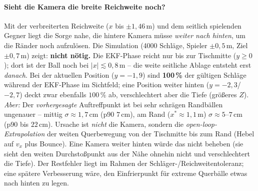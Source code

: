 \paragraph{Sieht die Kamera die breite Reichweite noch?} Mit der verbreiterten
Reichweite ($x$ bis $\pm1{,}46\,$m) und dem seitlich spielenden Gegner liegt die
Sorge nahe, die hintere Kamera müsse \emph{weiter nach hinten}, um die Ränder noch
aufzulösen. Die Simulation (4000 Schläge, Spieler $\pm0{,}5\,$m, Ziel $\pm0{,}7\,$m)
zeigt: \textbf{nicht nötig.} Die EKF-Phase reicht nur bis zur Tischmitte
($y\!\ge\!0$); dort ist der Ball noch bei $|x|\lesssim0{,}8\,$m -- die weite
seitliche Ablage entsteht erst \emph{danach}. Bei der aktuellen Position
($y=-1{,}9$) sind \textbf{100\,\%} der gültigen Schläge während der EKF-Phase im
Sichtfeld; eine Position weiter hinten ($y=-2{,}3$/$-2{,}7$) deckt zwar ebenfalls
$100\,\%$ ab, verschlechtert aber die Tiefe (größeres $Z$). \emph{Aber:} Der
\emph{vorhergesagte} Auftreffpunkt ist bei sehr schrägen Randbällen ungenauer --
mittig $\sigma\approx1{,}7\,$cm (p90 $7\,$cm), am Rand ($x^\ast\approx1{,}1\,$m)
$\sigma\approx5$--$7\,$cm (p90 bis $22\,$cm). Ursache ist \emph{nicht} die Kamera,
sondern die \emph{open-loop-Extrapolation} der weiten Querbewegung von der
Tischmitte bis zum Rand (Hebel auf $v_x$ plus Bounce). Eine Kamera weiter hinten
würde das nicht beheben (sie sieht den weiten Durchstoßpunkt aus der Nähe ohnehin
nicht und verschlechtert die Tiefe). Der Restfehler liegt im Rahmen der
Schläger-/Reichweitentoleranz; eine spätere Verbesserung wäre, den Einfrierpunkt
für extreme Querbälle etwas nach hinten zu legen.

